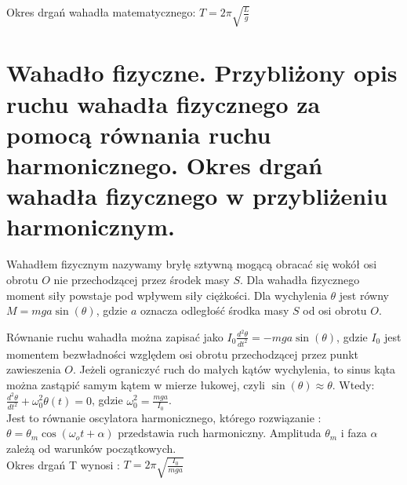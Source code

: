 \documentclass[a4paper,11pt]{article} %
\begin{document}
Okres drgań wahadła matematycznego: $T = 2\pi \sqrt{\frac{L}{g}}$

\section{Wahadło fizyczne. Przybliżony opis ruchu wahadła fizycznego za pomocą
równania ruchu harmonicznego. Okres drgań wahadła fizycznego w
przybliżeniu harmonicznym.{\color{red}{Gotowe}}}
Wahadłem fizycznym nazywamy bryłę sztywną mogącą obracać się wokół osi obrotu $O$ nie przechodzącej przez środek masy $S$. Dla wahadła fizycznego moment siły powstaje pod wpływem siły ciężkości. Dla wychylenia $\theta$ jest równy $M = mga\sin(\theta)$, gdzie $a$ oznacza odległość środka masy $S$ od osi obrotu $O$. 

Równanie ruchu wahadła można zapisać jako $I_0 \frac{d^2\theta}{dt^2} = -mga\sin(\theta)$, gdzie $I_0$ jest momentem bezwładności względem osi obrotu przechodzącej przez punkt zawieszenia $O$. Jeżeli ograniczyć ruch do małych kątów wychylenia, to sinus kąta można zastąpić samym kątem w mierze łukowej, czyli $\sin(\theta) \approx \theta$. Wtedy: \\
$\frac{d^2\theta}{dt^2} + \omega_0^2 \theta(t) = 0$, gdzie $\omega_0^2 = \frac{mga}{I_0}$.\\ Jest to równanie oscylatora harmonicznego, którego rozwiązanie : \\
$ \theta = \theta_m \cos(\omega_o t + \alpha)$ przedstawia ruch harmoniczny. Amplituda $\theta_m$ i faza $\alpha$ zależą od warunków początkowych. \\
Okres drgań T wynosi : $ T = 2 \pi \sqrt{\frac{I_0}{mga}}$
\end{document}
